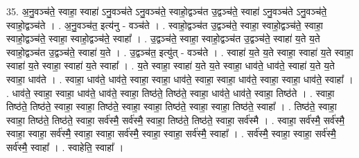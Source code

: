 \documentclass[17pt]{extarticle}
\begin{document}
35. अ॒नु॒वञ्च॑ते॒ स्वाहा॒ स्वाहा॑ ऽनु॒वञ्च॑ते ऽनु॒वञ्च॑ते॒ स्वाहो॒द्वञ्च॑त उ॒द्वञ्च॑ते॒ स्वाहा॑ ऽनु॒वञ्च॑ते ऽनु॒वञ्च॑ते॒ स्वाहो॒द्वञ्च॑ते । . अ॒नु॒वञ्च॑त॒ इत्य॑नु - वञ्च॑ते । . स्वाहो॒द्वञ्च॑त उ॒द्वञ्च॑ते॒ स्वाहा॒ स्वाहो॒द्वञ्च॑ते॒ स्वाहा॒ स्वाहो॒द्वञ्च॑ते॒ स्वाहा॒ स्वाहो॒द्वञ्च॑ते॒ स्वाहा᳚ । . उ॒द्वञ्च॑ते॒ स्वाहा॒ स्वाहो॒द्वञ्च॑त उ॒द्वञ्च॑ते॒ स्वाहा॑ य॒ते य॒ते स्वाहो॒द्वञ्च॑त उ॒द्वञ्च॑ते॒ स्वाहा॑ य॒ते । . उ॒द्वञ्च॑त॒ इत्यु॑त् - वञ्च॑ते । . स्वाहा॑ य॒ते य॒ते स्वाहा॒ स्वाहा॑ य॒ते स्वाहा॒ स्वाहा॑ य॒ते स्वाहा॒ स्वाहा॑ य॒ते स्वाहा᳚ । . य॒ते स्वाहा॒ स्वाहा॑ य॒ते य॒ते स्वाहा॒ धाव॑ते॒ धाव॑ते॒ स्वाहा॑ य॒ते य॒ते स्वाहा॒ धाव॑ते । . स्वाहा॒ धाव॑ते॒ धाव॑ते॒ स्वाहा॒ स्वाहा॒ धाव॑ते॒ स्वाहा॒ स्वाहा॒ धाव॑ते॒ स्वाहा॒ स्वाहा॒ धाव॑ते॒ स्वाहा᳚ । . धाव॑ते॒ स्वाहा॒ स्वाहा॒ धाव॑ते॒ धाव॑ते॒ स्वाहा॒ तिष्ठ॑ते॒ तिष्ठ॑ते॒ स्वाहा॒ धाव॑ते॒ धाव॑ते॒ स्वाहा॒ तिष्ठ॑ते । . स्वाहा॒ तिष्ठ॑ते॒ तिष्ठ॑ते॒ स्वाहा॒ स्वाहा॒ तिष्ठ॑ते॒ स्वाहा॒ स्वाहा॒ तिष्ठ॑ते॒ स्वाहा॒ स्वाहा॒ तिष्ठ॑ते॒ स्वाहा᳚ । . तिष्ठ॑ते॒ स्वाहा॒ स्वाहा॒ तिष्ठ॑ते॒ तिष्ठ॑ते॒ स्वाहा॒ सर्व॑स्मै॒ सर्व॑स्मै॒ स्वाहा॒ तिष्ठ॑ते॒ तिष्ठ॑ते॒ स्वाहा॒ सर्व॑स्मै । . स्वाहा॒ सर्व॑स्मै॒ सर्व॑स्मै॒ स्वाहा॒ स्वाहा॒ सर्व॑स्मै॒ स्वाहा॒ स्वाहा॒ सर्व॑स्मै॒ स्वाहा॒ स्वाहा॒ सर्व॑स्मै॒ स्वाहा᳚ । . सर्व॑स्मै॒ स्वाहा॒ स्वाहा॒ सर्व॑स्मै॒ सर्व॑स्मै॒ स्वाहा᳚ । . स्वाहेति॒ स्वाहा᳚ । \newline
\pagebreak
\end{document}
